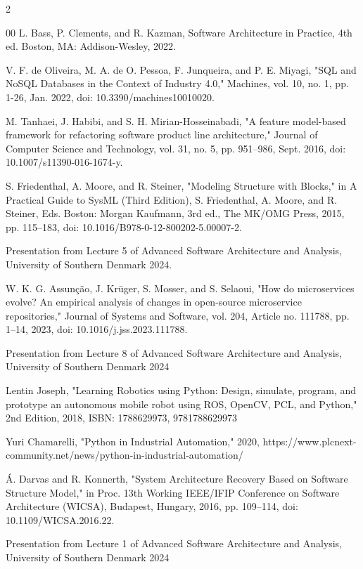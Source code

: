 \documentclass{article}
\begin{document}
\begin{multicols}{2}

\begin{thebibliography}{00}
 L. Bass, P. Clements, and R. Kazman, Software Architecture in Practice, 4th ed. Boston, MA: Addison-Wesley, 2022.

 V. F. de Oliveira, M. A. de O. Pessoa, F. Junqueira, and P. E. Miyagi, "SQL and NoSQL Databases in the Context of Industry 4.0," Machines, vol. 10, no. 1, pp. 1-26, Jan. 2022, doi: 10.3390/machines10010020.

 M. Tanhaei, J. Habibi, and S. H. Mirian-Hosseinabadi, "A feature model-based framework for refactoring software product line architecture," Journal of Computer Science and Technology, vol. 31, no. 5, pp. 951–986, Sept. 2016, doi: 10.1007/s11390-016-1674-y.

S. Friedenthal, A. Moore, and R. Steiner, "Modeling Structure with Blocks," in A Practical Guide to SysML (Third Edition), S. Friedenthal, A. Moore, and R. Steiner, Eds. Boston: Morgan Kaufmann, 3rd ed., The MK/OMG Press, 2015, pp. 115–183, doi: 10.1016/B978-0-12-800202-5.00007-2.

Presentation from Lecture 5 of Advanced Software Architecture and Analysis, University of Southern Denmark 2024. 

W. K. G. Assunção, J. Krüger, S. Mosser, and S. Selaoui, "How do microservices evolve? An empirical analysis of changes in open-source microservice repositories," Journal of Systems and Software, vol. 204, Article no. 111788, pp. 1–14, 2023, doi: 10.1016/j.jss.2023.111788.

Presentation from Lecture 8 of Advanced Software Architecture and Analysis, University of Southern Denmark 2024

Lentin Joseph, "Learning Robotics using Python: Design, simulate, program, and prototype an autonomous mobile robot using ROS, OpenCV, PCL, and Python," 2nd Edition, 2018, ISBN: 1788629973, 9781788629973

 Yuri Chamarelli, "Python in Industrial Automation," 2020, https://www.plcnext-community.net/news/python-in-industrial-automation/

 Á. Darvas and R. Konnerth, "System Architecture Recovery Based on Software Structure Model," in Proc. 13th Working IEEE/IFIP Conference on Software Architecture (WICSA), Budapest, Hungary, 2016, pp. 109–114, doi: 10.1109/WICSA.2016.22.

 Presentation from Lecture 1 of Advanced
Software Architecture and Analysis, University of Southern Denmark 2024


\end{thebibliography}
\end{multicols}
\end{document}
